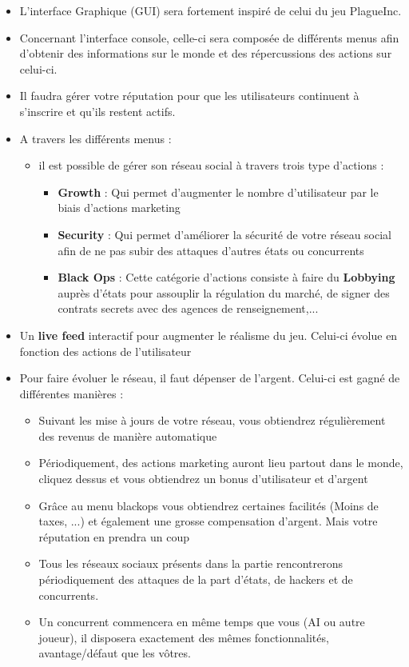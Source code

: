 \begin{itemize}
    \item L'interface Graphique (GUI) sera fortement inspiré de celui du jeu PlagueInc. 
    \item Concernant l'interface console, celle-ci sera composée de différents menus afin d'obtenir des informations sur le monde et des répercussions des actions sur celui-ci.
    
    \item Il faudra gérer votre réputation pour que les utilisateurs continuent à s'inscrire et qu'ils restent actifs.
    
    \item A travers les différents menus :
    
    \begin{itemize}
        \item il est possible de gérer son réseau social à travers trois type d'actions :
    
        \begin{itemize}
            \item \textbf{Growth} : Qui permet d'augmenter le nombre d'utilisateur par le biais d'actions marketing
            \item \textbf{Security} : Qui permet d'améliorer la sécurité de votre réseau social afin de ne pas subir des attaques d'autres états ou concurrents
            \item \textbf{Black Ops} : Cette catégorie d'actions consiste à faire du \textbf{Lobbying} auprès d'états pour assouplir la régulation du marché, de signer des contrats secrets avec des agences de renseignement,...
        \end{itemize}
        \end{itemize}
        \item{Un \textbf{live feed} interactif pour augmenter le réalisme du jeu. Celui-ci évolue en fonction des actions de l'utilisateur}
        \item Pour faire évoluer le réseau, il faut dépenser de l'argent. Celui-ci est gagné de différentes manières : 
        \begin{itemize}
            \item Suivant les mise à jours de votre réseau, vous obtiendrez régulièrement des revenus de manière automatique
            \item Périodiquement, des actions marketing auront lieu partout dans le monde, cliquez dessus et vous obtiendrez un bonus d'utilisateur et d'argent
            \item Grâce au menu blackops vous obtiendrez certaines facilités (Moins de taxes, ...) et également une grosse compensation d'argent. Mais votre réputation en prendra un coup
        \item Tous les réseaux sociaux présents dans la partie rencontrerons périodiquement des attaques de la part d'états, de hackers et de concurrents.
        \item Un concurrent commencera en même temps que vous (AI ou autre joueur), il disposera exactement des mêmes fonctionnalités, avantage/défaut que les vôtres.
    \end{itemize}
\end{itemize}

